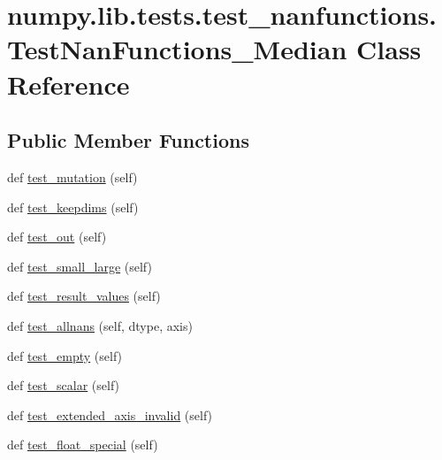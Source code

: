 \hypertarget{classnumpy_1_1lib_1_1tests_1_1test__nanfunctions_1_1TestNanFunctions__Median}{}\section{numpy.\+lib.\+tests.\+test\+\_\+nanfunctions.\+Test\+Nan\+Functions\+\_\+\+Median Class Reference}
\label{classnumpy_1_1lib_1_1tests_1_1test__nanfunctions_1_1TestNanFunctions__Median}
\subsection*{Public Member Functions}
\begin{DoxyCompactItemize}
\item 
def \hyperlink{classnumpy_1_1lib_1_1tests_1_1test__nanfunctions_1_1TestNanFunctions__Median_abd5fe0615c23ef15e5945f07027008b0}{test\+\_\+mutation} (self)
\item 
def \hyperlink{classnumpy_1_1lib_1_1tests_1_1test__nanfunctions_1_1TestNanFunctions__Median_a760bc3bf1e2291f7c377b377c3a10ad3}{test\+\_\+keepdims} (self)
\item 
def \hyperlink{classnumpy_1_1lib_1_1tests_1_1test__nanfunctions_1_1TestNanFunctions__Median_aef55ccfd124949c904d38830ab799538}{test\+\_\+out} (self)
\item 
def \hyperlink{classnumpy_1_1lib_1_1tests_1_1test__nanfunctions_1_1TestNanFunctions__Median_ada8f2590971bfac507b470dde89f13da}{test\+\_\+small\+\_\+large} (self)
\item 
def \hyperlink{classnumpy_1_1lib_1_1tests_1_1test__nanfunctions_1_1TestNanFunctions__Median_ae0c521b6325ea40eec27fe7657dadf2f}{test\+\_\+result\+\_\+values} (self)
\item 
def \hyperlink{classnumpy_1_1lib_1_1tests_1_1test__nanfunctions_1_1TestNanFunctions__Median_a5eca2b3682ae25209249f3f5373507a6}{test\+\_\+allnans} (self, dtype, axis)
\item 
def \hyperlink{classnumpy_1_1lib_1_1tests_1_1test__nanfunctions_1_1TestNanFunctions__Median_ad44e97765d578da12b086b1342bc9e48}{test\+\_\+empty} (self)
\item 
def \hyperlink{classnumpy_1_1lib_1_1tests_1_1test__nanfunctions_1_1TestNanFunctions__Median_aa4598286cc4e68d724340e1e68389211}{test\+\_\+scalar} (self)
\item 
def \hyperlink{classnumpy_1_1lib_1_1tests_1_1test__nanfunctions_1_1TestNanFunctions__Median_a0cd5decccd111b247e4fd2dece483300}{test\+\_\+extended\+\_\+axis\+\_\+invalid} (self)
\item 
def \hyperlink{classnumpy_1_1lib_1_1tests_1_1test__nanfunctions_1_1TestNanFunctions__Median_a7d93b40b186651e36def818bf4c29e01}{test\+\_\+float\+\_\+special} (self)
\end{DoxyCompactItemize}


